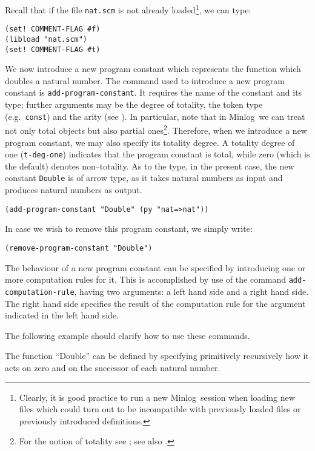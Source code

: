 \documentclass[12pt]{amsart}
\newcommand{\inquotes}[1]{``#1''}
\newcommand{\mi}{Minlog}
\begin{document}
Recall that if the file \texttt{nat.scm} is not already
loaded\footnote{Clearly, it is good practice to run a new \mi\ session
  when loading new files which could turn out to be incompatible with
  previously loaded files or previously introduced definitions.}, we
can type:
\begin{verbatim}
(set! COMMENT-FLAG #f)
(libload "nat.scm")
(set! COMMENT-FLAG #t)
\end{verbatim}

We now introduce a new program constant which represents the function
which doubles a natural number.  The command used to introduce a new
program constant is \texttt{add-program-constant}. It requires the
name of the constant and its type; further arguments may be the degree
of totality, the token type (e.g.\ \texttt{const}) and the arity (see
\cite{minlogman}).  In particular, note that in \mi\ we can treat not
only total objects but also partial ones\footnote{For the notion of
  totality see \cite[Chapter 8.3]{Stoltenberg94}; see also
  \cite{SchwichtenbergWainer12}.}.  Therefore, when we introduce a new
program constant, we may also specify its totality degree. A totality
degree of one (\texttt{t-deg-one}) indicates that the program constant
is total, while zero (which is the default) denotes non--totality.  As
to the type, in the present case, the new constant \texttt{Double} is
of arrow type, as it takes natural numbers as input and produces
natural numbers as output.

\begin{verbatim}
(add-program-constant "Double" (py "nat=>nat"))
\end{verbatim}

In case we wish to remove this program constant, we simply write:
\begin{verbatim}
(remove-program-constant "Double")
\end{verbatim}

The behaviour of a new program constant can be specified by
introducing one or more computation rules for it.  This is accomplished
by use of the command \texttt{add-computation-rule}, having two
arguments: a left hand side and a right hand side.  The right hand
side specifies the result of the computation rule for the argument
indicated in the left hand side.

The following example should clarify how to use these commands.

The function \inquotes{Double} can be defined by specifying
primitively recursively how it acts on zero and on the successor of
each natural number.
\end{document}
